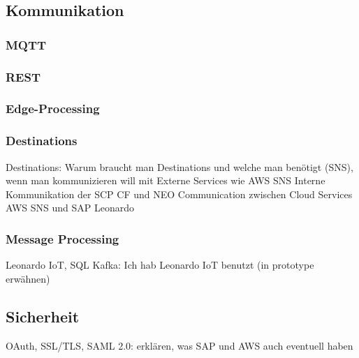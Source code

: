 \subsection{Kommunikation}

\subsubsection{MQTT}

\subsubsection{REST}

\subsubsection{Edge-Processing}

\subsubsection{Destinations}
Destinations: Warum braucht man Destinations und welche man benötigt (SNS),  wenn man kommunizieren will mit
Externe Services wie AWS SNS
Interne Kommunikation der SCP CF und NEO
Communication zwischen Cloud Services AWS SNS und SAP Leonardo

\subsubsection{Message Processing}
Leonardo IoT, SQL Kafka: Ich hab Leonardo IoT benutzt (in prototype erwähnen)

\subsection{Sicherheit}
OAuth, SSL/TLS, SAML 2.0: erklären, was SAP und AWS auch eventuell haben

